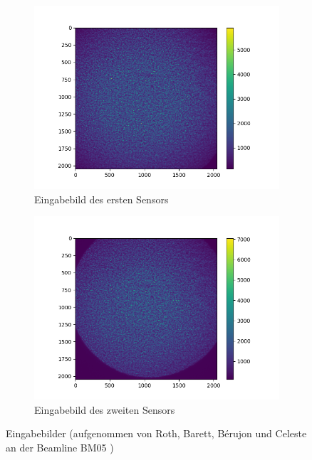 \begin{figure}[htbp]
	\centering
	\begin{subfigure}[b]{0.45\textwidth}
		\centering
		\includegraphics[width=\textwidth]{img/ref_start0001_1-10}
		\caption[Erster Sensor]{Eingabebild des ersten Sensors}
		\label{fig:eingabe_sensor1}
	\end{subfigure}
	\begin{subfigure}[b]{0.45\textwidth}
		\centering
		\includegraphics[width=\textwidth]{img/E10001}
		\caption[Zweiter Sensor]{Eingabebild des zweiten Sensors}
		\label{fig:eingabe_sensor2}
	\end{subfigure}
	\caption[Eingabe]{Eingabebilder (aufgenommen von Roth, Barett, Bérujon und Celeste an der Beamline BM05 \cite{RBB+17})}
	\label{fig:eingabebilder}
\end{figure}

